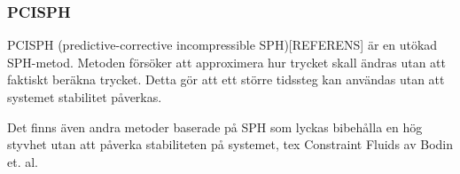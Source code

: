 \documentclass[a4paper,12pt,oneside,final]{extarticle}
\begin{document}
\subsubsection{PCISPH}
PCISPH (predictive-corrective incompressible SPH)[REFERENS] är en utökad SPH-metod.
Metoden försöker att approximera hur trycket skall ändras utan att faktiskt beräkna trycket.
Detta gör att ett större tidssteg kan användas utan att systemet stabilitet påverkas.

Det finns även andra metoder baserade på SPH som lyckas bibehålla en hög styvhet utan att påverka stabiliteten på systemet, tex Constraint Fluids\cite{bodin} av Bodin et. al.






\end{document}
